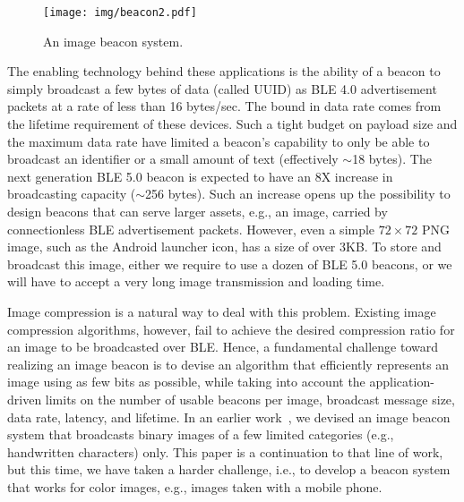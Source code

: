 \begin{figure}[!thb]
	\begin{center}
		\texttt{[image: img/beacon2.pdf]}
		\caption{An image beacon system.}
		\label{fig:beacons}
	\end{center}
	\vspace{-2em}
\end{figure}

The enabling technology behind these applications is the ability of a beacon to simply broadcast a few bytes of data (called UUID) as BLE 4.0 advertisement packets at a rate of less than 16 bytes/sec. The bound in data rate comes from the lifetime requirement of these devices. Such a tight budget on payload size and the maximum data rate have limited a beacon's capability to only be able to broadcast an identifier or a small amount of text (effectively $\sim$18 bytes). The next generation BLE 5.0 beacon is expected to have an 8X increase in broadcasting capacity ($\sim$256 bytes). Such an increase opens up the possibility to design beacons that can serve larger assets, e.g., an image, carried by connectionless BLE advertisement packets. However, even a simple $72\times 72$ PNG image, such as the Android launcher icon, has a size of over 3KB. To store and broadcast this image, either we require to use a dozen of BLE 5.0 beacons, or we will have to accept a very long image transmission and loading time.

Image compression is a natural way to deal with this problem. Existing image compression algorithms, however, fail to achieve the desired compression ratio for an image to be broadcasted over BLE. Hence, a fundamental challenge toward realizing an image beacon is to devise an algorithm that efficiently represents an image using as few bits as possible, while taking into account the application-driven limits on the number of usable beacons per image, broadcast message size, data rate, latency, and lifetime. In an earlier work~\cite{shaoyears}, we devised an image beacon system that broadcasts binary images of a few limited categories (e.g., handwritten characters) only. This paper is a continuation to that line of work, but this time, we have taken a harder challenge, i.e., to develop a beacon system that works for color images, e.g., images taken with a mobile phone.


